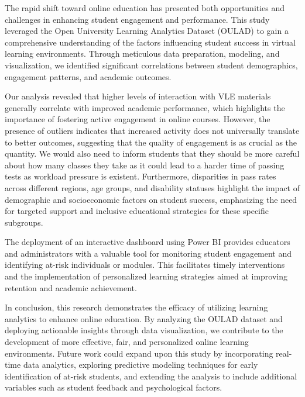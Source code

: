 The rapid shift toward online education has presented both opportunities and challenges in enhancing student engagement and performance. This study leveraged the Open University Learning Analytics Dataset (OULAD) to gain a comprehensive understanding of the factors influencing student success in virtual learning environments. Through meticulous data preparation, modeling, and visualization, we identified significant correlations between student demographics, engagement patterns, and academic outcomes.

Our analysis revealed that higher levels of interaction with VLE materials generally correlate with improved academic performance, which highlights the importance of fostering active engagement in online courses. However, the presence of outliers indicates that increased activity does not universally translate to better outcomes, suggesting that the quality of engagement is as crucial as the quantity. We would also need to inform students that they should be more careful about how many classes they take as it could lead to a harder time of passing tests as workload pressure is existent. Furthermore, disparities in pass rates across different regions, age groups, and disability statuses highlight the impact of demographic and socioeconomic factors on student success, emphasizing the need for targeted support and inclusive educational strategies for these specific subgroups.

The deployment of an interactive dashboard using Power BI provides educators and administrators with a valuable tool for monitoring student engagement and identifying at-risk individuals or modules. This facilitates timely interventions and the implementation of personalized learning strategies aimed at improving retention and academic achievement.

In conclusion, this research demonstrates the efficacy of utilizing learning analytics to enhance online education. By analyzing the OULAD dataset and deploying actionable insights through data visualization, we contribute to the development of more effective, fair, and personalized online learning environments. Future work could expand upon this study by incorporating real-time data analytics, exploring predictive modeling techniques for early identification of at-risk students, and extending the analysis to include additional variables such as student feedback and psychological factors.



